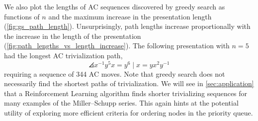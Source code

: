 We also plot the lengths of AC sequences discovered by greedy search as functions of $n$ and the maximum increase in the presentation length (\autoref{fig:gs_path_length}).
Unsurprisingly, path lengths increase proportionally with the increase in the length of the presentation (\autoref{fig:path_lengths_vs_length_increase}).
The following presentation with $n=5$ had the longest AC trivialization path,
\[
\angles{x^{-1} y^5 x = y^6 \mid  x = y x^2 y^{-1}}
\]
requiring a sequence of 344 AC moves.
Note that greedy search does not necessarily find the shortest paths of trivialization.
We will see in \autoref{sec:application} that a Reinforcement Learning algorithm finds shorter trivializing sequences for many examples of the Miller--Schupp series.
This again hints at the potential utility of exploring more efficient criteria for ordering nodes in the priority queue.

